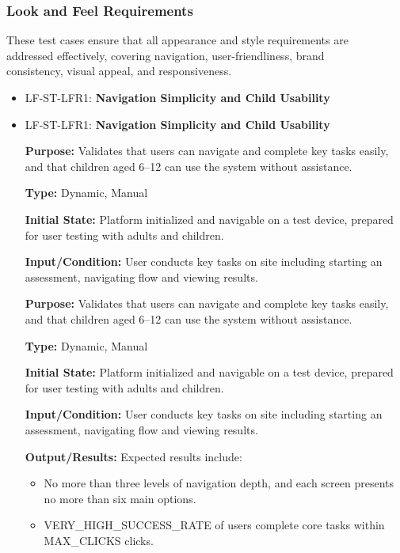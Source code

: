 \documentclass[12pt, titlepage]{article}
\begin{document}
\subsubsection{Look and Feel Requirements}

These test cases ensure that all appearance and style requirements are\\
addressed effectively, covering navigation, user-friendliness, brand \\
consistency, visual appeal, and responsiveness.

\begin{itemize} 
  \item LF-ST-LFR1: \textbf{Navigation Simplicity and Child Usability}
  \item LF-ST-LFR1: \textbf{Navigation Simplicity and Child Usability}
  \begin{mdframed}[linewidth=0.5mm] 
    \textbf{Purpose:} Validates that users can navigate and complete key tasks easily, and that children aged 6–12 can use the system without assistance. \par
    \textbf{Type:} Dynamic, Manual \par 
    \textbf{Initial State:} Platform initialized and navigable on a test device, prepared for user testing with adults and children. \par 
    \textbf{Input/Condition:} User conducts key tasks on site including starting an assessment, navigating flow and viewing results. \par 
    \textbf{Purpose:} Validates that users can navigate and complete key tasks easily, and that children aged 6–12 can use the system without assistance. \par
    \textbf{Type:} Dynamic, Manual \par 
    \textbf{Initial State:} Platform initialized and navigable on a test device, prepared for user testing with adults and children. \par 
    \textbf{Input/Condition:} User conducts key tasks on site including starting an assessment, navigating flow and viewing results. \par 
    \textbf{Output/Results:} Expected results include: 
    \begin{itemize} 
      \item No more than three levels of navigation depth, and each screen presents no more than six main options. 
      \item VERY\_HIGH\_SUCCESS\_RATE of users complete core tasks within \\ MAX\_CLICKS clicks. 

\end{itemize}
\end{mdframed}
\end{itemize}
\end{document}
